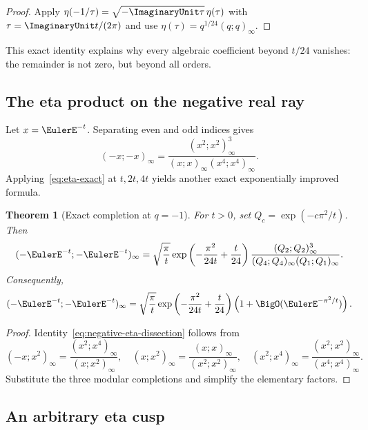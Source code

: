 \documentclass[11pt,oneside]{article}
\newtheorem{theorem}{Theorem}[section]
\theoremstyle{definition}
\theoremstyle{remark}
\let\reportsubsection\subsection
\let\section\reportsubsection
\begin{document}
\begin{proof}
Apply $\eta(-1/\tau)=\sqrt{-\ImaginaryUnit\tau}\,\eta(\tau)$ with
$\tau=\ImaginaryUnit t/(2\pi)$ and use
$\eta(\tau)=q^{1/24}(q;q)_\infty$.
\end{proof}

This exact identity explains why every algebraic coefficient beyond $t/24$
vanishes: the remainder is not zero, but beyond all orders.

\section{The eta product on the negative real ray}

Let $x=\EulerE^{-t}$.  Separating even and odd indices gives
\begin{equation}\label{eq:negative-eta-dissection}
 (-x;-x)_\infty
 =\frac{(x^2;x^2)_\infty^3}
 {(x;x)_\infty(x^4;x^4)_\infty}.
\end{equation}
Applying~\eqref{eq:eta-exact} at $t,2t,4t$ yields another exact exponentially
improved formula.

\begin{theorem}[Exact completion at $q=-1$]\label{thm:negative-eta}
For $t>0$, set
\(
Q_c=\exp(-c\pi^2/t)
\).  Then
\begin{equation}\label{eq:negative-eta-exact}
 (-\EulerE^{-t};-\EulerE^{-t})_\infty
 =\sqrt{\frac{\pi}{t}}
 \exp\left(-\frac{\pi^2}{24t}+\frac{t}{24}\right)
 \frac{(Q_2;Q_2)_\infty^3}{(Q_4;Q_4)_\infty(Q_1;Q_1)_\infty}.
\end{equation}
Consequently,
\begin{equation}\label{eq:negative-eta-leading}
 (-\EulerE^{-t};-\EulerE^{-t})_\infty
 =\sqrt{\frac{\pi}{t}}
 \exp\left(-\frac{\pi^2}{24t}+\frac{t}{24}\right)
 \left(1+\BigO(\EulerE^{-\pi^2/t})\right).
\end{equation}
\end{theorem}

\begin{proof}
Identity~\eqref{eq:negative-eta-dissection} follows from
\[
 (-x;x^2)_\infty
 =\frac{(x^2;x^4)_\infty}{(x;x^2)_\infty},
 \quad
 (x;x^2)_\infty=\frac{(x;x)_\infty}{(x^2;x^2)_\infty},
 \quad
 (x^2;x^4)_\infty=\frac{(x^2;x^2)_\infty}{(x^4;x^4)_\infty}.
\]
Substitute the three modular completions and simplify the elementary factors.
\end{proof}

\section{An arbitrary eta cusp}
\end{document}

